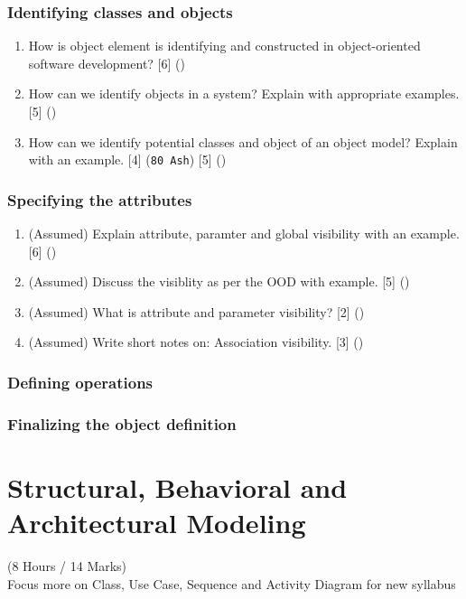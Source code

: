 \documentclass[12pt]{article}
\begin{document}
    \subsubsection{Identifying classes and objects}
      \begin{enumerate}
        \item How is object element is identifying and constructed in object-oriented software development? \hfill [6] ()

        \item How can we identify objects in a system? Explain with appropriate examples. \hfill [5] ()

        \item How can we identify potential classes and object of an object model? Explain with an example. \hfill [4] (\texttt{80 Ash}) [5] ()
      \end{enumerate}

    \subsubsection{Specifying the attributes}
      \begin{enumerate}
        \item (Assumed) Explain attribute, paramter and global visibility with an example. \hfill [6] ()

        \item (Assumed) Discuss the visiblity as per the OOD with example. \hfill [5] ()

        \item (Assumed) What is attribute and parameter visibility? \hfill [2] ()

        \item (Assumed) Write short notes on: Association visibility. \hfill [3] () 
      \end{enumerate}

    \subsubsection{Defining operations}
    \subsubsection{Finalizing the object definition}

\pagebreak

\section{Structural, Behavioral and Architectural Modeling}
  \begin{center}
    (8 Hours / 14 Marks)\\
    Focus more on Class, Use Case, Sequence and Activity Diagram for new syllabus
  \end{center}
 
\end{document}
